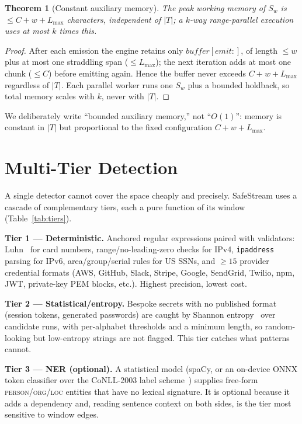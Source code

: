 \documentclass[conference]{IEEEtran}
\newtheorem{theorem}{Theorem}
\begin{document}
\begin{theorem}[Constant auxiliary memory]\label{thm:mem}
The peak working memory of $S_w$ is $\le C+w+L_{\max}$ characters, independent of
$|T|$; a $k$-way range-parallel execution uses at most $k$ times this.
\end{theorem}
\begin{proof}
After each emission the engine retains only $\textit{buffer}[\textit{emit}{:}]$,
of length $\le w$ plus at most one straddling span ($\le L_{\max}$); the next
iteration adds at most one chunk ($\le C$) before emitting again. Hence the buffer
never exceeds $C+w+L_{\max}$ regardless of $|T|$. Each parallel worker runs one
$S_w$ plus a bounded holdback, so total memory scales with $k$, never with $|T|$.
\end{proof}

We deliberately write ``bounded auxiliary memory,'' not ``$O(1)$'': memory is
constant in $|T|$ but proportional to the fixed configuration $C+w+L_{\max}$.

\section{Multi-Tier Detection}\label{sec:detect}

A single detector cannot cover the space cheaply and precisely. SafeStream uses a
cascade of complementary tiers, each a pure function of its window
(Table~\ref{tab:tiers}).

\textbf{Tier 1 --- Deterministic.} Anchored regular expressions paired with
validators: Luhn~\cite{luhn1960} for card numbers, range/no-leading-zero checks
for IPv4, \texttt{ipaddress} parsing for IPv6, area/group/serial rules for US
SSNs, and $\geq15$ provider credential formats (AWS, GitHub, Slack, Stripe,
Google, SendGrid, Twilio, npm, JWT, private-key PEM blocks, etc.). Highest
precision, lowest cost.

\textbf{Tier 2 --- Statistical/entropy.} Bespoke secrets with no published format
(session tokens, generated passwords) are caught by Shannon
entropy~\cite{shannon1948} over candidate runs, with per-alphabet thresholds and
a minimum length, so random-looking but low-entropy strings are not flagged. This
tier catches what patterns cannot.

\textbf{Tier 3 --- NER (optional).} A statistical model (spaCy, or an on-device
ONNX token classifier over the CoNLL-2003 label scheme~\cite{conll2003}) supplies
free-form \textsc{person}/\textsc{org}/\textsc{loc} entities that have no lexical
signature. It is optional because it adds a
dependency and, reading sentence context on both sides, is the tier most sensitive
to window edges.
\end{document}
